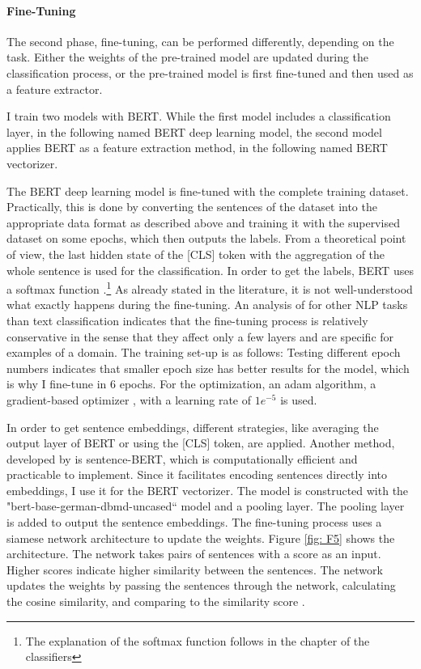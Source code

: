 \documentclass[12pt, a4paper, titlepage]{article}
\begin{document}
\paragraph{Fine-Tuning}
The second phase, fine-tuning, can be performed differently, depending on the task. Either the weights of the pre-trained model are updated during the classification process, or the pre-trained model is first fine-tuned and then used as a feature extractor. 

I train two models with \ac{BERT}. While the first model includes a classification layer, in the following named \ac{BERT} deep learning model, the second model applies \ac{BERT} as a feature extraction method, in the following named \ac{BERT} vectorizer. 

The \ac{BERT} deep learning model is fine-tuned with the complete training dataset. Practically, this is done by converting the sentences of the dataset into the appropriate data format as described above and training it with the supervised dataset on some epochs, which then outputs the labels. From a theoretical point of view, the last hidden state of the [CLS] token with the aggregation of the whole sentence is used for the classification. In order to get the labels, \ac{BERT} uses a softmax function \citep{sun2019}.\footnote{The explanation of the softmax function follows in the chapter of the classifiers} As already stated in the literature, it is not well-understood what exactly happens during the fine-tuning. An analysis of \citet{merchant2020} for other NLP tasks than text classification indicates that the fine-tuning process is relatively conservative in the sense that they affect only a few layers and are specific for examples of a domain. The training set-up is as follows: Testing different epoch numbers indicates that smaller epoch size has better results for the model, which is why I fine-tune in 6 epochs. For the optimization, an adam algorithm, a gradient-based optimizer \citep{kingma2014}, with a learning rate of $1e^{-5}$ is used. 

In order to get sentence embeddings, different strategies, like averaging the output layer of \ac{BERT} or using the [CLS] token, are applied. Another method, developed by \citet{reimers2019} is sentence-\ac{BERT}, which is computationally efficient and practicable to implement. Since it facilitates encoding sentences directly into embeddings, I use it for the \ac{BERT} vectorizer. The model is constructed with the "bert-base-german-dbmd-uncased`` model and a pooling layer. The pooling layer is added to output the sentence embeddings. The fine-tuning process uses a siamese network architecture to update the weights. Figure \ref{fig: F5} shows the architecture. The network takes pairs of sentences with a score as an input. Higher scores indicate higher similarity between the sentences. The network updates the weights by passing the sentences through the network, calculating the cosine similarity, and comparing to the similarity score \citep{reimers2019}.
\end{document}
